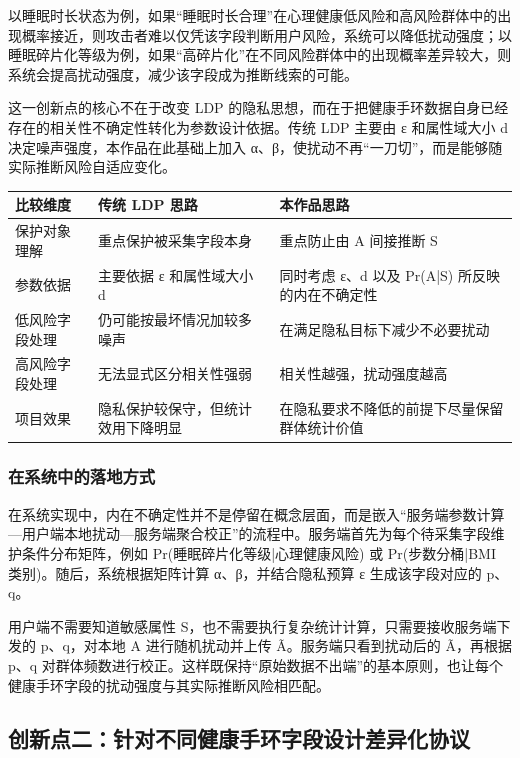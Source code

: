 \documentclass{cumcmthesis}
\numberwithin{equation}{section}
\numberwithin{figure}{section}
\numberwithin{table}{section}
\begin{document}
以睡眠时长状态为例，如果“睡眠时长合理”在心理健康低风险和高风险群体中的出现概率接近，则攻击者难以仅凭该字段判断用户风险，系统可以降低扰动强度；以睡眠碎片化等级为例，如果“高碎片化”在不同风险群体中的出现概率差异较大，则系统会提高扰动强度，减少该字段成为推断线索的可能。

这一创新点的核心不在于改变 LDP 的隐私思想，而在于把健康手环数据自身已经存在的相关性不确定性转化为参数设计依据。传统 LDP 主要由 ε 和属性域大小 d 决定噪声强度，本作品在此基础上加入 α、β，使扰动不再“一刀切”，而是能够随实际推断风险自适应变化。

\begin{table}[htbp]
\centering
\small
\begin{tabularx}{\textwidth}{|>{\raggedright\arraybackslash}X|>{\raggedright\arraybackslash}X|>{\raggedright\arraybackslash}X|}
\hline
比较维度 & 传统 LDP 思路 & 本作品思路 \\ \hline
保护对象理解 & 重点保护被采集字段本身 & 重点防止由 A 间接推断 S \\ \hline
参数依据 & 主要依据 ε 和属性域大小 d & 同时考虑 ε、d 以及 Pr(A|S) 所反映的内在不确定性 \\ \hline
低风险字段处理 & 仍可能按最坏情况加较多噪声 & 在满足隐私目标下减少不必要扰动 \\ \hline
高风险字段处理 & 无法显式区分相关性强弱 & 相关性越强，扰动强度越高 \\ \hline
项目效果 & 隐私保护较保守，但统计效用下降明显 & 在隐私要求不降低的前提下尽量保留群体统计价值 \\ \hline
\end{tabularx}
\end{table}

\subsubsection{在系统中的落地方式}

在系统实现中，内在不确定性并不是停留在概念层面，而是嵌入“服务端参数计算—用户端本地扰动—服务端聚合校正”的流程中。服务端首先为每个待采集字段维护条件分布矩阵，例如 Pr(睡眠碎片化等级|心理健康风险) 或 Pr(步数分桶|BMI 类别)。随后，系统根据矩阵计算 α、β，并结合隐私预算 ε 生成该字段对应的 p、q。

用户端不需要知道敏感属性 S，也不需要执行复杂统计计算，只需要接收服务端下发的 p、q，对本地 A 进行随机扰动并上传 Ã。服务端只看到扰动后的 Ã，再根据 p、q 对群体频数进行校正。这样既保持“原始数据不出端”的基本原则，也让每个健康手环字段的扰动强度与其实际推断风险相匹配。

\subsection{创新点二：针对不同健康手环字段设计差异化协议}
\end{document}
